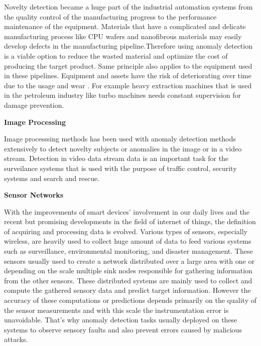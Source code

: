 Novelty detection became a huge part of the industrial automation systems from the quality control
of the manufacturing progress to the performance maintenance of the equipment. Materials that have
a complicated and delicate manufacturing process like CPU wafers \cite{Kim:2012:MLN:2076800.2076903} and nanofibrous
materials \cite{Napoletano2018anomaly} may easily develop defects in the manufacturing pipeline.Therefore using
anomaly detection is a viable option to reduce the wasted material and optimize the cost of
producing the target product. Same principle also applies to the equipment used in these pipelines.
Equipment and assets have the risk of deteriorating over time due to the usage
and wear \cite{Pimentel:2014:RRN:2588908.2589196}. For example heavy extraction machines that is used in the
petroleum industry like turbo machines \cite{s150202774} needs constant supervision for damage
prevention. 

\textbf{ Image Processing}

Image processsing methods has been used with anomaly detection methods extensively to detect novelty
subjects or anomalies in the image or in a video stream. Detection in video data stream data is an
important task for the surveilance systems that is used with the purpose of traffic control,
security systems and search and rescue. \cite{image_anomaly} 

\textbf{ Sensor Networks}

With the improvements of smart devices' involvement in our daily lives and the recent but promising developments
in the field of internet of things, the definition of acquiring and processing data is evolved.
Various types of sensors, especially wireless, are heavily used to collect huge amount of data to
feed various systems such as surveillance, environmental monitoring, and disaster management.
\cite{UlIslam2018} These sensors usually used to create a network distributed over a large area with
one or depending on the scale multiple sink nodes responsible for gathering information from the
other sensors. These distributed systems are mainly used to collect and compute the gathered sensory data and predict 
target information. However the accuracy of these computations or predictions depends
primarily on the quality of the sensor measurements and with this scale the instrumentation error
is unavoidable. That's why anomaly detection tasks usually deployed on these systems to observe
sensory faults and also prevent errors caused by malicious attacks. \cite{Pimentel:2014:RRN:2588908.2589196} \cite{iot_anomaly}


